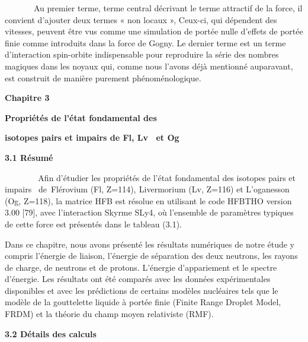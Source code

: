 \documentclass[a4paper]{article}
\begin{document}
\bigskip

\textcolor[rgb]{0.13725491,0.12156863,0.1254902}{\ \ \ \ \ \ \ Au premier terme, terme central décrivant le terme
attractif de la force, il convient d'ajouter deux termes « non locaux », Ceux-ci, qui dépendent des vitesses, peuvent
être vus}\textit{\textcolor[rgb]{0.13725491,0.12156863,0.1254902}{
}}\textcolor[rgb]{0.13725491,0.12156863,0.1254902}{comme une simulation de portée nulle d'effets de portée finie comme
introduits dans la force de Gogny. Le dernier terme est un terme d'interaction spin-orbite indispensable pour
reproduire la série des nombres magiques dans les noyaux qui, comme nous l'avons déjà mentionné auparavant, est
construit de manière purement phénoménologique.}


\bigskip


\bigskip


\bigskip

\textbf{Chapitre 3}


\bigskip

\textbf{Propriétés de l’état fondamental des}

\textbf{isotopes pairs et impairs de Fl, Lv \ et Og}


\bigskip

\textbf{3.1 Résumé}


\bigskip

\textbf{\ \ \ \ \ \ \ }Afin d'étudier les propriétés de l'état fondamental\textbf{ }des isotopes pairs et impairs
\ de\textcolor[rgb]{0.1254902,0.12941177,0.13333334}{~Flérovium} (Fl,
Z=114),\textbf{\textcolor[rgb]{0.1254902,0.12941177,0.13333334}{
}}\textcolor[rgb]{0.1254902,0.12941177,0.13333334}{Livermorium }(Lv, Z=116) et L’oganesson (Og, Z=118), la matrice HFB
est résolue en utilisant le code HFBTHO version 3.00 [79], avec l'interaction Skyrme SLy4, où l’ensemble de paramètres
typiques de cette force est présentés dans le tableau (3.1). 

Dans ce chapitre, nous avons présenté les résultats numériques de notre étude y compris l'énergie de liaison, l'énergie
de séparation des deux neutrons, les rayons de charge, de neutrons et de protons. L’énergie d’appariement et le spectre
d’énergie. Les résultats ont été comparés avec les données expérimentales disponibles et avec les prédictions de
certains modèles nucléaires tels que le modèle de la gouttelette liquide à portée finie (Finite Range Droplet Model,
FRDM) et la théorie du champ moyen relativiste (RMF).


\bigskip

\textbf{3.2 Détails des calculs}
\end{document}
